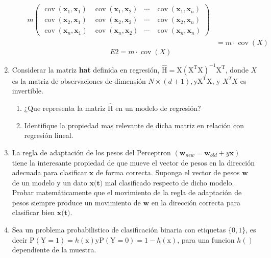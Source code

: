 \documentclass[12pt,a4paper]{article}
\begin{document}
\begin{enumerate}
\begin{enumerate}
{\begin{equation}
\begin{aligned}
		m\left( \begin{array}{cccc}{\operatorname{cov}\left(\mathbf{x}_{1}, \mathbf{x}_{1}\right)} & {\operatorname{cov}\left(\mathbf{x}_{1}, \mathbf{x}_{2}\right)} & {\cdots} & {\operatorname{cov}\left(\mathbf{x}_{1}, \mathbf{x}_{n}\right)} \\ {\operatorname{cov}\left(\mathbf{x}_{2}, \mathbf{x}_{1}\right)} & {\operatorname{cov}\left(\mathbf{x}_{2}, \mathbf{x}_{2}\right)} & {\cdots} & {\operatorname{cov}\left(\mathbf{x}_{2}, \mathbf{x}_{n}\right)} \\ {\operatorname{cov}\left(\mathbf{x}_{n}, \mathbf{x}_{1}\right)} & {\operatorname{cov}\left(\mathbf{x}_{n}, \mathbf{x}_{2}\right)} & {\cdots} & {\operatorname{cov}\left(\mathbf{x}_{n}, \mathbf{x}_{n}\right)}\end{array}\right) \\ &= m\cdot \operatorname{cov}(X)
\end{aligned}
\end{equation}}
$$
E2=m\cdot \operatorname{cov}(X)
$$
	\end{enumerate}
	\item Considerar la matriz \textbf{hat} definida en regresión, $\hat{\mathrm{H}}=\mathrm{X}\left(\mathrm{X}^{\mathrm{T}} \mathrm{X}\right)^{-1} \mathrm{X}^{\mathrm{T}}$, donde $X$ es la matriz de observaciones de dimensión $N \times(d+1), \mathrm{y} \mathrm{X}^{\mathrm{T}} \mathrm{X}$, y  $X^TX$ es invertible.
	\begin{enumerate}
		\item ¿Que representa la matriz $\hat{\mathrm{H}}$ en un modelo de regresión?
		\item Identifique la propiedad mas relevante de dicha matriz en relación con regresión lineal.
	\end{enumerate}
	\item  La regla de adaptación de los pesos del Perceptron $\left(\mathbf{w}_{n e w}=\mathbf{w}_{o l d}+y \mathbf{x}\right)$ tiene la interesante propiedad de que mueve el vector de pesos en la dirección adecuada para clasificar $\textbf{x}$ de
	forma correcta. Suponga el vector de pesos $\textbf{w}$ de un modelo y un dato $\textbf{x(t)}$ mal clasificado
	respecto de dicho modelo. Probar matemáticamente que el movimiento de la regla de
	adaptación de pesos siempre produce un movimiento de $\textbf{w}$ en la dirección correcta para
	clasificar bien $\textbf{x(t)}$.
	\item Sea un problema probabilistico de clasificación binaria con etiquetas $\{0,1\}$, es decir $\mathrm{P}(\mathrm{Y}=1)=h(\mathrm{x}) \mathrm{y} \mathrm{P}(\mathrm{Y}=0)=1-h(\mathrm{x})$, para una funcion $h()$ dependiente de la muestra.

\end{enumerate}
\end{document}
